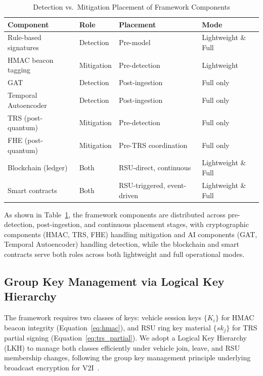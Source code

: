 \documentclass[12pt, a4paper]{report}
\begin{document}
\begin{table}[H]
\centering
\caption{Detection vs.\ Mitigation Placement of Framework Components}
\label{tab:pipeline_placement}
\renewcommand{\arraystretch}{1.3}
\begin{tabular}{|p{3.2cm}|p{1.8cm}|p{3.4cm}|p{3.0cm}|}
\hline
\textbf{Component} & \textbf{Role} & \textbf{Placement} & \textbf{Mode} \\
\hline
Rule-based signatures  & Detection   & Pre-model           & Lightweight \& Full \\
\hline
HMAC beacon tagging    & Mitigation  & Pre-detection       & Lightweight \\
\hline
GAT                    & Detection   & Post-ingestion      & Full only \\
\hline
Temporal Autoencoder   & Detection   & Post-ingestion      & Full only \\
\hline
TRS (post-quantum)     & Mitigation  & Pre-detection       & Full only \\
\hline
FHE (post-quantum)     & Mitigation  & Pre-TRS coordination & Full only \\
\hline
Blockchain (ledger)    & Both        & RSU-direct, continuous      & Lightweight \& Full \\
\hline
Smart contracts        & Both        & RSU-triggered, event-driven & Lightweight \& Full \\
\hline
\end{tabular}
\end{table}
As shown in Table~\ref{tab:pipeline_placement}, the framework components
are distributed across pre-detection, post-ingestion, and continuous
placement stages, with cryptographic components (HMAC, TRS, FHE)
handling mitigation and AI components (GAT, Temporal Autoencoder)
handling detection, while the blockchain and smart contracts serve both
roles across both lightweight and full operational modes.

\subsection{Group Key Management via Logical Key Hierarchy}
\label{sec:lkh}

The framework requires two classes of keys: vehicle session keys
$\{K_i\}$ for HMAC beacon integrity (Equation~\ref{eq:hmac}), and RSU
ring key material $\{sk_j\}$ for TRS partial signing
(Equation~\ref{eq:trs_partial}). We adopt a Logical Key Hierarchy (LKH)
to manage both classes efficiently under vehicle join, leave, and RSU
membership changes, following the group key management principle
underlying broadcast encryption for V2I~\cite{zhong2022broadcast}.
\end{document}
